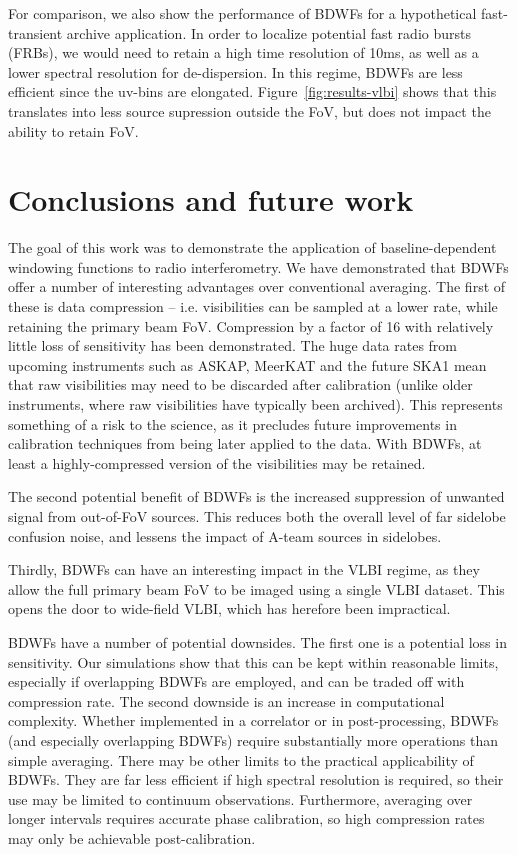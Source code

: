 \documentclass[useAMS,usenatbib]{mn2e}
\begin{document}
For comparison, we also show the performance of BDWFs for a hypothetical fast-transient archive application. In 
order to localize potential fast radio bursts (FRBs), we would need to retain a high time resolution of 10ms, as 
well as a lower spectral resolution for de-dispersion. In this regime, BDWFs are less efficient since the 
uv-bins are elongated. Figure~\ref{fig:results-vlbi} shows that this translates into less source supression outside the FoV, but does not impact the ability to retain FoV.

\section{Conclusions and future work}

The goal of this work was to demonstrate the application of baseline-dependent windowing functions to radio 
interferometry. We have demonstrated that BDWFs offer a number of interesting advantages over conventional averaging.
The first of these is data compression -- i.e. visibilities can be sampled at a lower rate, while retaining the primary 
beam FoV. Compression by a factor of 16 with relatively little loss of sensitivity has been demonstrated. The huge data 
rates from upcoming instruments such as ASKAP, MeerKAT and the future SKA1 mean that raw visibilities may need to be
discarded after calibration (unlike older instruments, where raw visibilities have typically been archived). This 
represents something of a risk to the science, as it precludes future improvements in calibration techniques from 
being later applied to the data. With BDWFs, at least a highly-compressed version of the visibilities may be retained.

The second potential benefit of BDWFs is the increased suppression of unwanted signal from out-of-FoV sources. This
reduces both the overall level of far sidelobe confusion noise, and lessens the impact of A-team sources in sidelobes.

Thirdly, BDWFs can have an interesting impact in the VLBI regime, as they allow the full primary beam FoV to be 
imaged using a single VLBI dataset. This opens the door to wide-field VLBI, which has herefore been impractical.

BDWFs have a number of potential downsides. The first one is a potential loss in sensitivity. Our simulations show 
that this can be kept within reasonable limits, especially if overlapping BDWFs are employed, and can be traded off with
compression rate. The second downside is an increase in computational complexity. Whether implemented in a correlator
or in post-processing, BDWFs (and especially overlapping BDWFs) require substantially more operations than simple averaging.
There may be other limits to the practical applicability of BDWFs. They are far less efficient if high spectral  
resolution is required, so their use may be limited to continuum observations. Furthermore, averaging over longer 
intervals requires accurate phase calibration, so high compression rates may only be achievable post-calibration.
\end{document}
